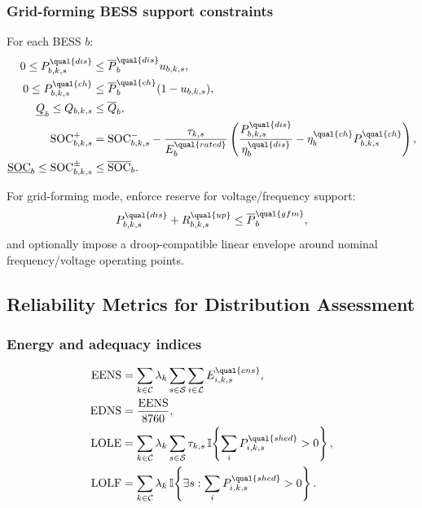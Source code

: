 \subsubsection{Grid-forming BESS support constraints}
For each BESS \(b\):
\begin{align}
0 \le P_{b,k,s}^{\qual{dis}} &\le \overline{P}_b^{\qual{dis}} u_{b,k,s}, \\
0 \le P_{b,k,s}^{\qual{ch}} &\le \overline{P}_b^{\qual{ch}} (1-u_{b,k,s}), \\
\underline{Q}_b \le Q_{b,k,s} &\le \overline{Q}_b, \\
\text{SOC}_{b,k,s}^{+} &= \text{SOC}_{b,k,s}^{-}
- \frac{\tau_{k,s}}{E_b^{\qual{rated}}}
\left(\frac{P_{b,k,s}^{\qual{dis}}}{\eta_b^{\qual{dis}}}
- \eta_b^{\qual{ch}} P_{b,k,s}^{\qual{ch}}\right), \\
\underline{\text{SOC}}_b \le \text{SOC}_{b,k,s}^{\pm} &\le \overline{\text{SOC}}_b.
\label{eq:bess-soc-outage}
\end{align}

For grid-forming mode, enforce reserve for voltage/frequency support:
\begin{align}
P_{b,k,s}^{\qual{dis}} + R_{b,k,s}^{\qual{up}} \le \overline{P}_b^{\qual{gfm}},
\end{align}
and optionally impose a droop-compatible linear envelope around nominal
frequency/voltage operating points.

\subsection{Reliability Metrics for Distribution Assessment}

\subsubsection{Energy and adequacy indices}
\begin{align}
\text{EENS} &= \sum_{k\in\mathcal{C}} \lambda_k
\sum_{s\in\mathcal{S}} \sum_{i\in\mathcal{L}} E^{\qual{ens}}_{i,k,s}, \\
\text{EDNS} &= \frac{\text{EENS}}{8760}, \\
\text{LOLE} &= \sum_{k\in\mathcal{C}} \lambda_k
\sum_{s\in\mathcal{S}} \tau_{k,s}\,\mathbb{I}\!\left\{\sum_i P^{\qual{shed}}_{i,k,s}>0\right\}, \\
\text{LOLF} &= \sum_{k\in\mathcal{C}} \lambda_k\,
\mathbb{I}\!\left\{\exists s: \sum_i P^{\qual{shed}}_{i,k,s}>0\right\}.
\end{align}

